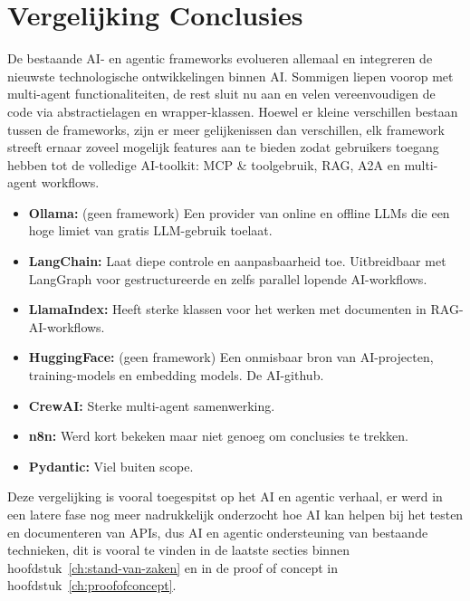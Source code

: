 \section{Vergelijking Conclusies}
\label{sec:vergelijkingconclusies}

De bestaande AI- en agentic frameworks evolueren allemaal en integreren de nieuwste technologische ontwikkelingen binnen AI. Sommigen liepen voorop met multi-agent functionaliteiten, de rest sluit nu aan en velen vereenvoudigen de code via abstractielagen en wrapper-klassen. Hoewel er kleine verschillen bestaan tussen de frameworks, zijn er meer gelijkenissen dan verschillen, elk framework streeft ernaar zoveel mogelijk features aan te bieden zodat gebruikers toegang hebben tot de volledige AI-toolkit: MCP \& toolgebruik, RAG, A2A en multi-agent workflows.

\begin{itemize}
    \item \textbf{Ollama:} (geen framework) Een provider van online en offline LLMs die een hoge limiet van gratis LLM-gebruik toelaat.
    \item \textbf{LangChain:} Laat diepe controle en aanpasbaarheid toe. Uitbreidbaar met LangGraph voor gestructureerde en zelfs 
    parallel lopende AI-workflows.
    \item \textbf{LlamaIndex:} Heeft sterke klassen voor het werken met documenten in RAG-AI-workflows.
    \item \textbf{HuggingFace:} (geen framework) Een onmisbaar bron van AI-projecten, training-models en embedding models. De AI-github. 
    \item \textbf{CrewAI:} Sterke multi-agent samenwerking.
    \item \textbf{n8n:} Werd kort bekeken maar niet genoeg om conclusies te trekken.
    \item \textbf{Pydantic:} Viel buiten scope.
\end{itemize}

Deze vergelijking is vooral toegespitst op het AI en agentic verhaal, er werd in een latere fase nog meer nadrukkelijk onderzocht hoe AI kan helpen bij het testen en documenteren van APIs, dus AI en agentic ondersteuning van bestaande technieken, dit is vooral te vinden in de laatste secties binnen hoofdstuk~\ref{ch:stand-van-zaken} en in de proof of concept in hoofdstuk~\ref{ch:proofofconcept}.







